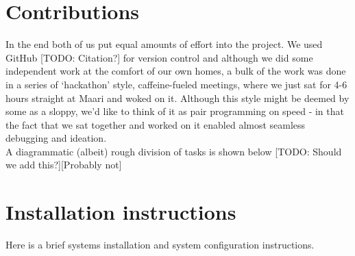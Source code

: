 
\section{Contributions}
In the end both of us put equal amounts of effort into the project. 
We used GitHub [TODO: Citation?] for version control and although we did
some independent work at the comfort of our own homes, a bulk of the work
was done in a series of \lq hackathon' style, caffeine-fueled meetings, where we just sat
for 4-6 hours straight at Maari and woked on it. Although this style might be deemed by some
as a sloppy, we'd like to think of it as pair programming on speed - in that 
the fact that we sat together and worked on it enabled almost seamless debugging
and ideation.\\

A diagrammatic (albeit) rough division of tasks is shown below [TODO: Should we add this?][Probably not]





\clearpage

\nocite{*}




\clearpage
\appendix
\section{Installation instructions} \label{App:instructions}


Here is a brief systems installation and system configuration instructions. 

